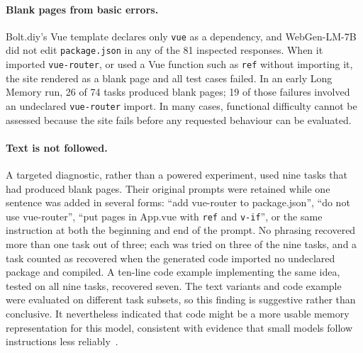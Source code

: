 \paragraph{Blank pages from basic errors.} Bolt.diy's Vue template declares only \texttt{vue} as a dependency, and WebGen-LM-7B did not edit \texttt{package.json} in any of the 81 inspected responses. When it imported \texttt{vue-router}, or used a Vue function such as \texttt{ref} without importing it, the site rendered as a blank page and all test cases failed. In an early Long Memory run, 26 of 74 tasks produced blank pages; 19 of those failures involved an undeclared \texttt{vue-router} import. In many cases, functional difficulty cannot be assessed because the site fails before any requested behaviour can be evaluated.

\paragraph{Text is not followed.} A targeted diagnostic, rather than a powered experiment, used nine tasks that had produced blank pages. Their original prompts were retained while one sentence was added in several forms: ``add vue-router to package.json'', ``do not use vue-router'', ``put pages in App.vue with \texttt{ref} and \texttt{v-if}'', or the same instruction at both the beginning and end of the prompt. No phrasing recovered more than one task out of three; each was tried on three of the nine tasks, and a task counted as recovered when the generated code imported no undeclared package and compiled. A ten-line code example implementing the same idea, tested on all nine tasks, recovered seven. The text variants and code example were evaluated on different task subsets, so this finding is suggestive rather than conclusive. It nevertheless indicated that code might be a more usable memory representation for this model, consistent with evidence that small models follow instructions less reliably~\cite{harada2025curse,li2025smallmodels}.

